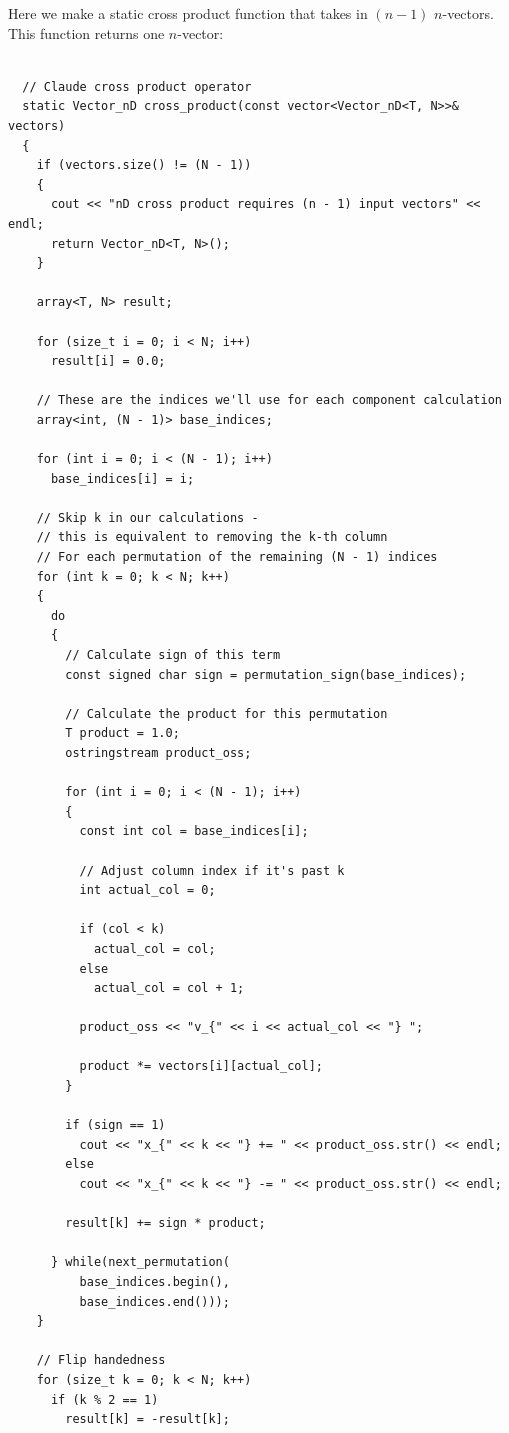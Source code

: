 \documentclass[12pt]{article}
\begin{document}
Here we make a static cross product function that takes in $(n - 1)$ $n$-vectors.
This function returns one $n$-vector:
\begin{lstlisting}

  // Claude cross product operator
  static Vector_nD cross_product(const vector<Vector_nD<T, N>>& vectors)
  {
    if (vectors.size() != (N - 1))
    {
      cout << "nD cross product requires (n - 1) input vectors" << endl;
      return Vector_nD<T, N>();
    }

    array<T, N> result;

    for (size_t i = 0; i < N; i++)
      result[i] = 0.0;

    // These are the indices we'll use for each component calculation
    array<int, (N - 1)> base_indices;

    for (int i = 0; i < (N - 1); i++)
      base_indices[i] = i;

    // Skip k in our calculations - 
    // this is equivalent to removing the k-th column
    // For each permutation of the remaining (N - 1) indices
    for (int k = 0; k < N; k++)
    {
      do
      {
        // Calculate sign of this term
        const signed char sign = permutation_sign(base_indices);

        // Calculate the product for this permutation
        T product = 1.0;
        ostringstream product_oss;

        for (int i = 0; i < (N - 1); i++)
        {
          const int col = base_indices[i];

          // Adjust column index if it's past k
          int actual_col = 0;

          if (col < k)
            actual_col = col;
          else
            actual_col = col + 1;

          product_oss << "v_{" << i << actual_col << "} ";

          product *= vectors[i][actual_col];
        }

        if (sign == 1)
          cout << "x_{" << k << "} += " << product_oss.str() << endl;
        else
          cout << "x_{" << k << "} -= " << product_oss.str() << endl;

        result[k] += sign * product;

      } while(next_permutation(
          base_indices.begin(), 
          base_indices.end()));
    }

    // Flip handedness
    for (size_t k = 0; k < N; k++)
      if (k % 2 == 1)
        result[k] = -result[k];


\end{lstlisting}
\end{document}
